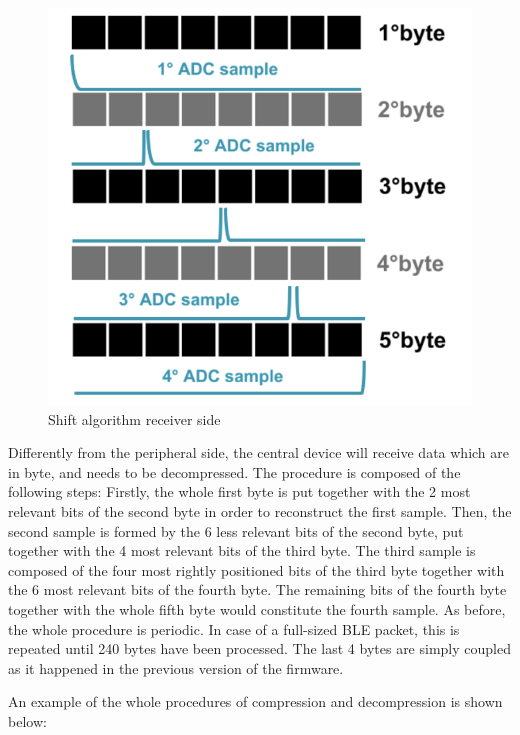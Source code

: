 \documentclass{Configuration_Files/PoliMi3i_thesis}
\begin{document}
\begin{figure}[H]
    \centering
    \includegraphics[scale=0.7]{Shift Algorithm/Screenshot 2024-07-22 at 22.31.56.png}
    \caption{Shift algorithm receiver side}
    \label{pairing_procedure_6}
\end{figure}

Differently from the peripheral side, the central device will receive data which are in byte, and needs to be decompressed. The procedure is composed of the following steps:
Firstly, the whole first byte is put together with the 2 most relevant bits of the second byte in order to reconstruct the first sample. Then, the second sample is formed by the 6 less relevant bits of the second byte, put together with the 4 most relevant bits of the third byte. The third sample is composed of the four most rightly positioned bits of the third byte together with the 6 most relevant bits of the fourth byte. The remaining bits of the fourth byte together with the whole fifth byte would constitute the fourth sample. As before, the whole procedure is periodic. In case of a full-sized BLE packet, this is repeated until 240 bytes have been processed. The last 4 bytes are simply coupled as it happened in the previous version of the firmware.

An example of the whole procedures of compression and decompression is shown below: 
\end{document}
